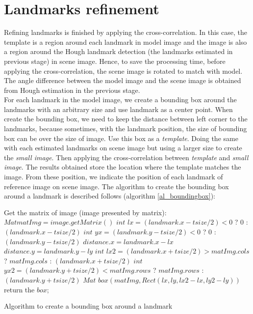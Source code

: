 \section{Landmarks refinement}
Refining landmarks is finished by applying the cross-correlation. In this case, the template is a region around each landmark in model image and the image is also a region around the Hough landmark detection (the landmarks estimated in previous stage) in scene image. Hence, to save the processing time, before applying the cross-correlation, the scene image is rotated to match with model. The angle difference between the model image and the scene image is obtained from Hough estimation in the previous stage.\\[0.2cm]
For each landmark in the model image, we create a bounding box around the landmarks with an arbitrary size and use landmark as a center point. When create the bounding box, we need to keep the distance between left corner to the landmarks, because sometimes, with the landmark position, the size of bounding box can be over the size of image. Use this box as a \textit{template}. Doing the same with each estimated landmarks on scene image but using a larger size to create the \textit{small image}. Then applying the cross-correlation between \textit{template} and \textit{small image}. The results obtained store the location where the template matches the image. From these position, we indicate the position of each landmark of reference image on scene image. The algorithm to create the bounding box around a landmark is described follows (algorithm \ref{al_boundingbox}):\\[0.2cm]
\begin{algorithm}[H]
\Indm 
{}
\SetAlgoLined
{}
\Indp
Get the matrix of image (image presented by matrix): $Mat matImg = image.getMatrix()$\;
$int$ $lx = (landmark.x - tsize/2) < 0$ ? $0$ : $(landmark.x - tsize/2)$\;
$int$ $yx = (landmark.y - tsize/2) < 0$ ? $0$ : $(landmark.y - tsize/2)$\;
$distance.x = landmark.x - lx$\;
$distance.y = landmark.y - ly$\;
$int$ $lx2 = (landmark.x + tsize/2) > matImg.cols$ ? $matImg.cols$ : $(landmark.x + tsize/2)$\;
$int$ $yx2 = (landmark.y + tsize/2) < matImg.rows$ ? $matImg.rows$ : $(landmark.y + tsize/2)$\;
$Mat$ $box(matImg,Rect(lx,ly,lx2 - lx, ly2 - ly))$\;
return the $box$;
\caption{Algorithm to create a bounding box around a landmark}
\label{al_boundingbox}
\end{algorithm}~\\[0.2cm]
